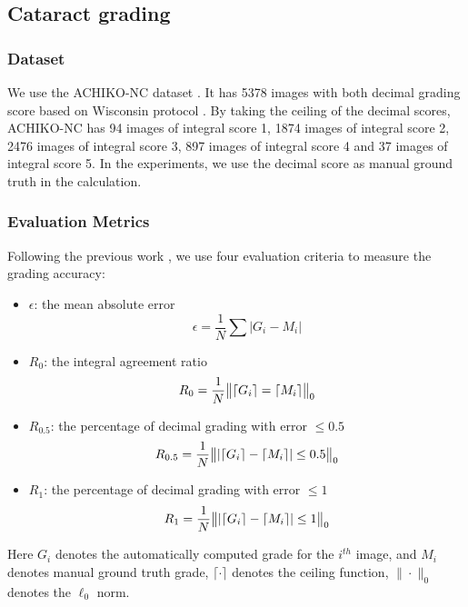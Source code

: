 \documentclass[journal]{IEEEtran}
\begin{document}
\subsection{Cataract grading}

\subsubsection{Dataset} We use the ACHIKO-NC dataset \cite{5415679}. It has 5378 images with both decimal  grading score  based on Wisconsin protocol \cite{Klein1990}. By taking the ceiling of the decimal scores,   ACHIKO-NC has 94 images of integral score 1, 1874 images of  integral score 2, 2476 images of  integral score 3, 897 images of  integral score 4 and 37 images of integral score 5. In the experiments, we use the decimal score as manual ground truth in the calculation.
\subsubsection{Evaluation Metrics}
Following the previous work  \cite{5415679}, we use   four evaluation criteria   to measure the grading accuracy:
\begin{itemize}
	\item $\epsilon$: the mean absolute error\begin{equation}
	\epsilon=\frac{1}{N} \sum |{G_i}-{M_i}|
	\end{equation}
	\item $R_0$: the integral agreement ratio \begin{equation}
	R_0= \frac{1}{N} \big{\|}\lceil{G_i}\rceil=\lceil{M_i}\rceil \big{\|}_0
	\end{equation}
	\item $R_{0.5}$: the percentage of decimal grading with error $\leq 0.5$ \begin{equation}
	R_{0.5}= \frac{1}{N} \big{\|}|\lceil{G_i}\rceil-\lceil{M_i}\rceil|\leq 0.5\big{\|}_0
	\end{equation}
	\item $R_{1}$: the percentage of decimal grading with error  $\leq 1$  \begin{equation}
	R_{1}= \frac{1}{N} \big{\|}|\lceil{G_i}\rceil-\lceil{M_i}\rceil|\leq 1\big{\|}_0
	\end{equation}

\end{itemize}
Here $G_i$  denotes the automatically computed grade for the $i^{th}$ image, and $M_i$  denotes manual ground truth grade, $\lceil \cdot \rceil$ denotes the ceiling function,   $\|\cdot\|_0$ denotes the $\ell_0$ norm.
\end{document}
